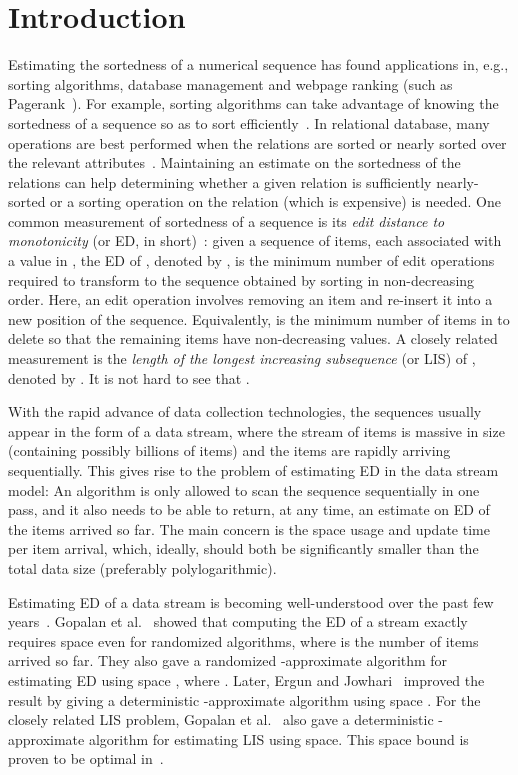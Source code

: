 \documentclass{llncs}
\begin{document}
\section{Introduction}

Estimating the sortedness of a numerical sequence
has found applications in, e.g., sorting algorithms,
database management and webpage ranking (such as Pagerank~\cite{BrP98}).
For example, sorting algorithms can take advantage of
knowing the sortedness of a sequence so as to sort efficiently~\cite{EsW92}.
In relational database, many operations are best performed
when the relations are sorted or nearly sorted over the relevant attributes~\cite{BKF+11}.
Maintaining an estimate on the sortedness of the relations can help determining
whether a given relation is sufficiently nearly-sorted or
a sorting operation on the relation (which is expensive) is needed.
One common measurement of sortedness of a sequence
is its \emph{edit distance to monotonicity} (or ED, in short)~\cite{AJK+02,CMS01,ErJ08,GaG07,GJK+07}:
given a sequence  of  items,
each associated with a value in ,
the ED of , denoted by ,
is the minimum number of edit operations required
to transform  to the sequence obtained
by sorting  in non-decreasing order.
Here, an edit operation involves removing an item and re-insert it into a
new position of the sequence.  Equivalently,
 is the minimum number of items in  to delete
so that the remaining items have non-decreasing values.
A closely related measurement
is the \emph{length of the longest increasing subsequence} (or LIS) of ,
denoted by .
It is not hard to see that .

With the rapid advance of data collection technologies,
the sequences usually appear in the form of a data stream,
where the stream of items is massive in size (containing possibly billions of items)
and the items are rapidly arriving sequentially.
This gives rise to the problem of estimating ED in the data stream model:
An algorithm is only allowed to scan the sequence sequentially in one pass,
and it also needs to be able to return, at any time,
an estimate on ED of the items arrived so far.
The main concern is the space usage and
update time per item arrival, which, ideally, should
both be significantly smaller than the total data size
(preferably polylogarithmic).

Estimating ED of a data stream is becoming well-understood
over the past few years~\cite{ErJ08,GaG07,GJK+07}.
Gopalan et al.~\cite{GJK+07} showed that computing the ED of a stream
exactly requires  space even for randomized algorithms,
where  is the number of items arrived so far.
They also gave a randomized -approximate algorithm
for estimating ED using space ,
where .
Later, Ergun and Jowhari~\cite{ErJ08} improved the result
by giving a deterministic -approximate algorithm
using space .
For the closely related LIS problem,
Gopalan et al.~\cite{GJK+07} also gave a deterministic
-approximate algorithm for estimating LIS
using  space.
This space bound is proven to be optimal in~\cite{GaG07}.
\end{document}
